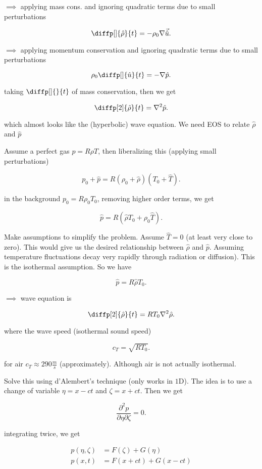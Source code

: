 $\implies$ applying mass cons. and ignoring quadratic terms due to small
perturbations 

\[
  \diffp[]{\hat \rho}{t} = - \rho_0 \nabla \vec{\hat u}
.\] 

$\implies$ applying momentum conservation and ignoring quadratic terms due to
small perturbations 

\[
  \rho_0 \diffp[]{\hat u}{t} = - \nabla\hat p
.\] 


taking $\diffp[]{}{t}$ of mass conservation, then we get

\[
\diffp[2]{\hat \rho}{t} = \nabla^{2}\hat p
.\] 

which almost looks like the (hyperbolic) wave equation. We need EOS to relate
$\hat \rho$ and $\hat p$


Assume a perfect gas  $p=R \rho T$, then liberalizing this (applying small
perturbations)

\[
  p_0 + \hat p = R ( \rho_0 + \hat \rho)(T_0+\hat T)
.\]

in the background $p_0=R \rho_0 T_0$, removing higher order terms, we get

\[
  \hat p = R(\hat \rho T_0 + \rho_0 \hat T)
.\] 

Make assumptions to simplify the problem. Assume $\hat T = 0$ (at least very
close to zero). This would give us the desired relationship between $\hat \rho$
and $\hat p$. Assuming temperature fluctuations decay very rapidly through
radiation or diffusion). This is the isothermal assumption. So we have

 \[
\hat p = R \hat \rho T_0
.\] 

$\implies$ wave equation is

\[
\diffp[2]{\hat \rho}{t} = R T_0 \nabla^{2}\hat \rho
.\] 

where the wave speed (isothermal sound speed)

\[
  c_{T} = \sqrt{RT_0}
.\] 

for air $c_{T} \approx 290 \frac{m}{s}$ (approximately). Although air is not actually
isothermal.


Solve this using d'Alembert's technique (only works in $1$D). The idea is to
use a change of variable $ \eta = x- ct$ and $\zeta = x+ct$. Then we get

\[
  \frac{\partial^{2}p}{\partial\eta\partial\zeta} = 0
.\] 

integrating twice, we get

\begin{align*}
  p(\eta,\zeta) &= F(\zeta) + G(\eta) \\
  p(x,t) &= F(x+ct) + G(x-ct)
\end{align*}

